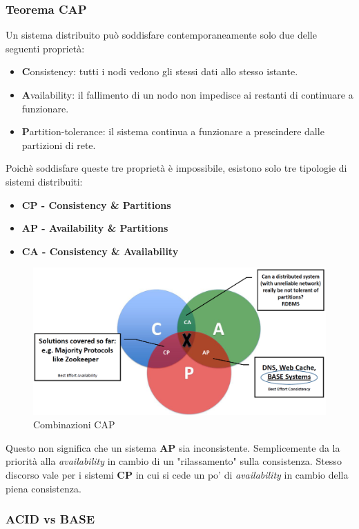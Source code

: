 \documentclass{article}
\begin{document}
\subsubsection{Teorema CAP}
Un sistema distribuito può soddisfare contemporaneamente solo due delle seguenti proprietà:
\begin{itemize}
    \item \textbf{C}onsistency: tutti i nodi vedono gli stessi dati allo stesso istante.
    \item \textbf{A}vailability: il fallimento di un nodo non impedisce ai restanti di continuare a funzionare.
    \item  \textbf{P}artition-tolerance: il sistema continua a funzionare a prescindere dalle partizioni di rete.
\end{itemize}
Poichè soddisfare queste tre proprietà è impossibile, esistono solo tre tipologie di sistemi distribuiti:
\begin{itemize}
    \item \textbf{CP - Consistency \& Partitions}
    \item \textbf{AP - Availability \& Partitions}
    \item \textbf{CA - Consistency \& Availability}
\end{itemize}
\begin{figure}[H]
    \centering
    \includegraphics[scale=0.2]{img/cap.png}
    \caption{Combinazioni CAP}
\end{figure}\noindent
Questo non significa che un sistema \textbf{AP} sia inconsistente. Semplicemente da la priorità alla \textit{availability} in cambio di un "rilassamento" sulla consistenza. Stesso discorso vale per i sistemi \textbf{CP} in cui si cede un po' di \textit{availability} in cambio della piena consistenza.

\subsubsection{ACID vs BASE}
\end{document}
